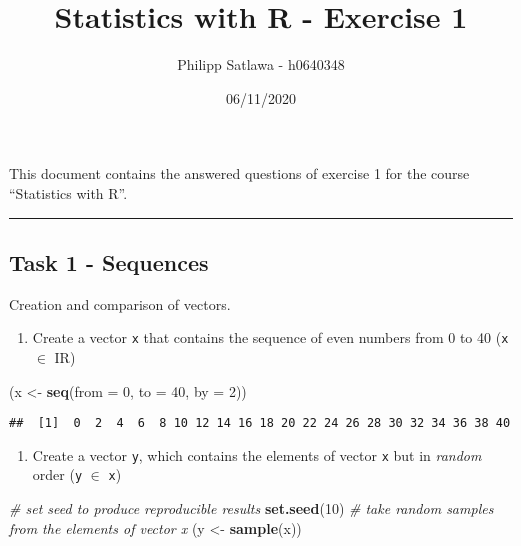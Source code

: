 \documentclass[
]{article}
\title{Statistics with R - Exercise 1}
\author{Philipp Satlawa - h0640348}
\date{06/11/2020}
\newenvironment{Shaded}{\begin{snugshade}}{\end{snugshade}}
\newcommand{\CommentTok}[1]{\textcolor[rgb]{0.56,0.35,0.01}{\textit{#1}}}
\newcommand{\DataTypeTok}[1]{\textcolor[rgb]{0.13,0.29,0.53}{#1}}
\newcommand{\DecValTok}[1]{\textcolor[rgb]{0.00,0.00,0.81}{#1}}
\newcommand{\KeywordTok}[1]{\textcolor[rgb]{0.13,0.29,0.53}{\textbf{#1}}}
\newcommand{\NormalTok}[1]{#1}
\newcommand{\StringTok}[1]{\textcolor[rgb]{0.31,0.60,0.02}{#1}}
\providecommand{\tightlist}{%
  \setlength{\itemsep}{0pt}\setlength{\parskip}{0pt}}
\begin{document}
\maketitle

This document contains the answered questions of exercise 1 for the
course ``Statistics with R''.

\begin{center}\rule{0.5\linewidth}{0.5pt}\end{center}

\hypertarget{task-1---sequences}{%
\subsection{Task 1 - Sequences}\label{task-1---sequences}}

Creation and comparison of vectors.

\begin{enumerate}
\def\labelenumi{\arabic{enumi}.}
\tightlist
\item
  Create a vector \texttt{x} that contains the sequence of even numbers
  from 0 to 40 (\texttt{x} \(\in\) \rm I\!R)
\end{enumerate}

\begin{Shaded}
\begin{Highlighting}[]
\NormalTok{(x <-}\StringTok{ }\KeywordTok{seq}\NormalTok{(}\DataTypeTok{from =} \DecValTok{0}\NormalTok{, }\DataTypeTok{to =} \DecValTok{40}\NormalTok{, }\DataTypeTok{by =} \DecValTok{2}\NormalTok{))}
\end{Highlighting}
\end{Shaded}

\begin{verbatim}
##  [1]  0  2  4  6  8 10 12 14 16 18 20 22 24 26 28 30 32 34 36 38 40
\end{verbatim}

\begin{enumerate}
\def\labelenumi{\arabic{enumi}.}
\setcounter{enumi}{1}
\tightlist
\item
  Create a vector \texttt{y}, which contains the elements of vector
  \texttt{x} but in \emph{random} order (\texttt{y} \(\in\) \texttt{x})
\end{enumerate}

\begin{Shaded}
\begin{Highlighting}[]
\CommentTok{# set seed to produce reproducible results}
\KeywordTok{set.seed}\NormalTok{(}\DecValTok{10}\NormalTok{)}
\CommentTok{# take random samples from the elements of vector x}
\NormalTok{(y <-}\StringTok{ }\KeywordTok{sample}\NormalTok{(x))}
\end{Highlighting}
\end{Shaded}
\end{document}
